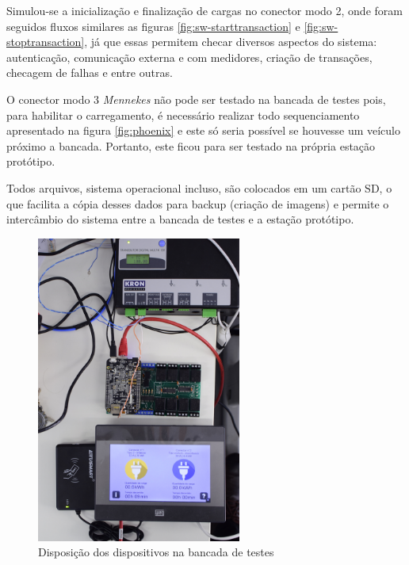     Simulou-se a inicialização e finalização de cargas no conector modo 2, onde foram seguidos fluxos similares as figuras \ref{fig:sw-starttransaction} e \ref{fig:sw-stoptransaction}, já que essas permitem checar diversos aspectos do sistema: autenticação, comunicação externa e com medidores, criação de transações, checagem de falhas e entre outras.

    O conector modo 3 \textit{Mennekes} não pode ser testado na bancada de testes pois, para habilitar o carregamento, é necessário realizar todo sequenciamento apresentado na figura \ref{fig:phoenix} e este só seria possível se houvesse um veículo próximo a bancada. Portanto, este ficou para ser testado na própria estação protótipo.

    Todos arquivos, sistema operacional incluso, são colocados em um cartão SD, o que facilita a cópia desses dados para backup (criação de imagens) e permite o intercâmbio do sistema entre a bancada de testes e a estação protótipo.

    \begin{figure}[H]
      \begin{center}
        \includegraphics[width=0.6\textwidth,natwidth=2130,natheight=1420,angle=-90]{assets/images/setup-tests.jpg}
        \caption{Disposição dos dispositivos na bancada de testes}
        \label{fig:setup-tests}
      \end{center}
    \end{figure}

